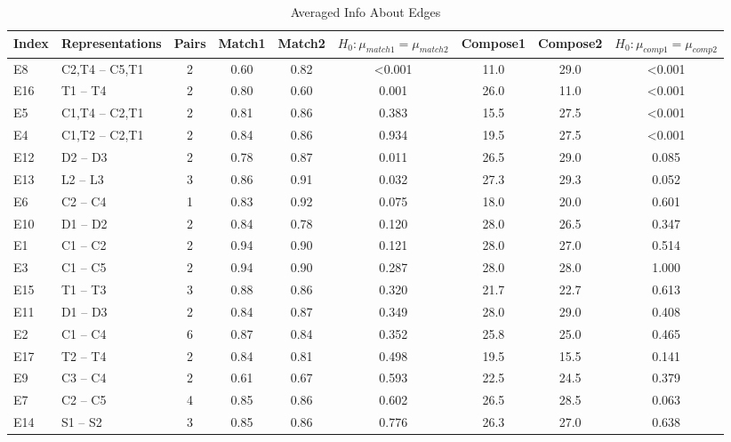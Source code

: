 \begin{table*}\begin{small}\begin{center}\caption{Averaged Info About Edges}\label{table:testedEdgesTable}\begin{tabular}
{llccccccc}
Index & Representations & Pairs & Match1 & Match2 & $H_0: \mu_{match1} = \mu_{match2}$ & Compose1 & Compose2 &  $H_0: \mu_{comp1} = \mu_{comp2}$ \\
\toprule[0.16em]

E8 & C2,T4 -- C5,T1 & 2 & 0.60 & 0.82 & <0.001 & 11.0 & 29.0 & <0.001\\

E16 & T1 -- T4 & 2 & 0.80 & 0.60 & 0.001 & 26.0 & 11.0 & <0.001\\

E5 & C1,T4 -- C2,T1 & 2 & 0.81 & 0.86 & 0.383 & 15.5 & 27.5 & <0.001\\
E4 & C1,T2 -- C2,T1 & 2 & 0.84 & 0.86 & 0.934 & 19.5 & 27.5 & <0.001\\


E12 & D2 -- D3 & 2 & 0.78 & 0.87 & 0.011 & 26.5 & 29.0 & 0.085\\
E13 & L2 -- L3 & 3 & 0.86 & 0.91 & 0.032 & 27.3 & 29.3 & 0.052\\
\hline
E6 & C2 -- C4 & 1 & 0.83 & 0.92 & 0.075 & 18.0 & 20.0 & 0.601\\
E10 & D1 -- D2 & 2 & 0.84 & 0.78 & 0.120 & 28.0 & 26.5 & 0.347\\
E1 & C1 -- C2 & 2 & 0.94 & 0.90 & 0.121 & 28.0 & 27.0 & 0.514\\
E3 & C1 -- C5 & 2 & 0.94 & 0.90 & 0.287 & 28.0 & 28.0 & 1.000\\
E15 & T1 -- T3 & 3 & 0.88 & 0.86 & 0.320 & 21.7 & 22.7 & 0.613\\
E11 & D1 -- D3 & 2 & 0.84 & 0.87 & 0.349 & 28.0 & 29.0 & 0.408\\
E2 & C1 -- C4 & 6 & 0.87 & 0.84 & 0.352 & 25.8 & 25.0 & 0.465\\
E17 & T2 -- T4 & 2 & 0.84 & 0.81 & 0.498 & 19.5 & 15.5 & 0.141\\
E9 & C3 -- C4 & 2 & 0.61 & 0.67 & 0.593 & 22.5 & 24.5 & 0.379\\
E7 & C2 -- C5 & 4 & 0.85 & 0.86 & 0.602 & 26.5 & 28.5 & 0.063\\
E14 & S1 -- S2 & 3 & 0.85 & 0.86 & 0.776 & 26.3 & 27.0 & 0.638\\



\bottomrule[0.13em]\end{tabular}\end{center}\end{small}\end{table*}
